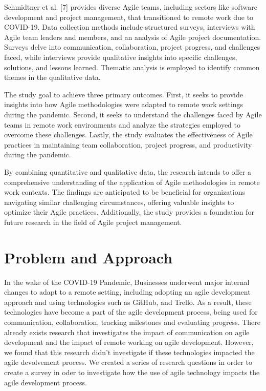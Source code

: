 \documentclass[conference]{IEEEtran}
\begin{document}
Schmidtner et al. [7] provides diverse Agile teams, including sectors like software development and project management, that transitioned to remote work due to COVID-19. Data collection methods include structured surveys, interviews with Agile team leaders and members, and an analysis of Agile project documentation. Surveys delve into communication, collaboration, project progress, and challenges faced, while interviews provide qualitative insights into specific challenges, solutions, and lessons learned. Thematic analysis is employed to identify common themes in the qualitative data.

The study goal to achieve three primary outcomes. First, it seeks to provide insights into how Agile methodologies were adapted to remote work settings during the pandemic. Second, it seeks to understand the challenges faced by Agile teams in remote work environments and analyze the strategies employed to overcome these challenges. Lastly, the study evaluates the effectiveness of Agile practices in maintaining team collaboration, project progress, and productivity during the pandemic.

By combining quantitative and qualitative data, the research intends to offer a comprehensive understanding of the application of Agile methodologies in remote work contexts. The findings are anticipated to be beneficial for organizations navigating similar challenging circumstances, offering valuable insights to optimize their Agile practices. Additionally, the study provides a foundation for future research in the field of Agile project management.

\section{Problem and Approach}
In the wake of the COVID-19 Pandemic, Businesses underwent major internal changes to adapt to a remote setting, including adopting an agile development approach and using technologies such as GitHub, and Trello. As a result, these technologies have become a part of the agile development process, being used for communication, collaboration, tracking milestones and evaluating progress.  There already exists research that investigates the impact of communication on agile development and the impact of remote working on agile development. However, we found that this research didn’t investigate if these technologies impacted the agile devolvement process. We created a series of research questions in order to create a survey in oder to investigate how the use of agile technology impacts the agile development process.
\end{document}
